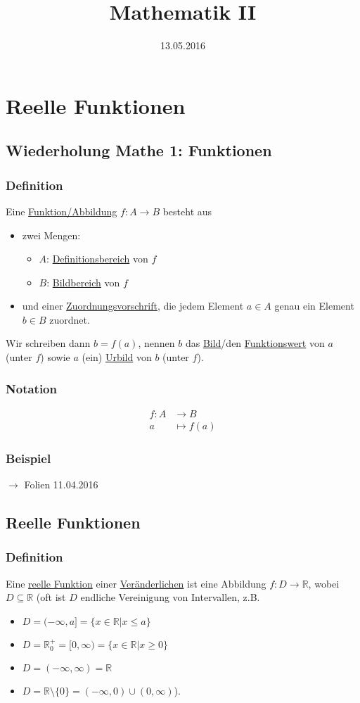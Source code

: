 \documentclass[12pt, titlepage]{article}
\title{Mathematik II}
\date{13.05.2016}
\newcommand{\R}{\mathds{R}}
\renewcommand{\*}{\cdot}
\begin{document}
	\maketitle
	\tableofcontents
	\newpage
	\section{Reelle Funktionen}
	\subsection{Wiederholung Mathe 1: Funktionen}
	\subsubsection*{Definition}
		Eine \underline{Funktion/Abbildung} $f\colon A\rightarrow B$ besteht aus
		\begin{itemize}
			\item zwei Mengen:
			\begin{itemize}
				\item $A$: \underline{Definitionsbereich} von $f$
				\item $B$: \underline{Bildbereich} von $f$
			\end{itemize}
			\item und einer \underline{Zuordnungsvorschrift}, die jedem Element $a\in A$ genau ein Element $b\in B$ zuordnet.
		\end{itemize}
		Wir schreiben dann $b=f(a)$, nennen $b$ das \underline{Bild}/den \underline{Funktionswert} von $a$ (unter $f$) sowie $a$ (ein) \underline{Urbild} von $b$ (unter $f$).
	\subsubsection*{Notation}
		\vspace{-1cm}\begin{align*}
			f\colon A&\rightarrow B\\
			a&\mapsto f(a)
		\end{align*}
	\subsubsection*{Beispiel}
		$\rightarrow$ Folien 11.04.2016
	\subsection{Reelle Funktionen}
	\subsubsection*{Definition}
	Eine \underline{reelle Funktion} einer \underline{Veränderlichen} ist eine Abbildung $f\colon D\rightarrow \R$, wobei $D\subseteq \R$ (oft ist $D$ endliche Vereinigung von Intervallen, z.B.
	\begin{itemize}
		\item $ D=(-\infty,a]=\{x\in \R|x\leq a\} $
		\item $ D=\R^+_0=[0,\infty)=\{x\in\R|x\geq 0\}$
		\item $ D=(-\infty,\infty)=\R $
		\item $ D=\R\setminus\{0\}=(-\infty,0)\cup(0,\infty) $\hfill).
	\end{itemize}
\end{document}
